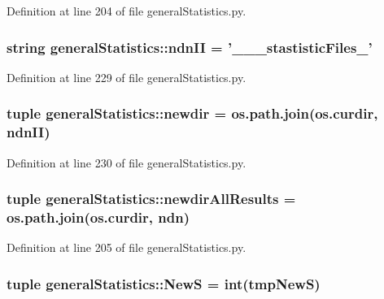 \-Definition at line 204 of file general\-Statistics.\-py.

\hypertarget{namespacegeneral_statistics_a7ccf9a2d306ba41029a6c988dea19484}{
\subsubsection[{ndn\-I\-I}]{\setlength{\rightskip}{0pt plus 5cm}string {\bf general\-Statistics\-::ndn\-I\-I} = '\-\_\-\-\_\-\_\-stastistic\-Files\-\_\-'}}\label{namespacegeneral_statistics_a7ccf9a2d306ba41029a6c988dea19484}


\-Definition at line 229 of file general\-Statistics.\-py.

\hypertarget{namespacegeneral_statistics_a862af869b2c09a9bcb32f2c159d387e8}{
\subsubsection[{newdir}]{\setlength{\rightskip}{0pt plus 5cm}tuple {\bf general\-Statistics\-::newdir} = os.\-path.\-join(os.\-curdir, {\bf ndn\-I\-I})}}\label{namespacegeneral_statistics_a862af869b2c09a9bcb32f2c159d387e8}


\-Definition at line 230 of file general\-Statistics.\-py.

\hypertarget{namespacegeneral_statistics_a467e98804f050cc4600b0705a664fea1}{
\subsubsection[{newdir\-All\-Results}]{\setlength{\rightskip}{0pt plus 5cm}tuple {\bf general\-Statistics\-::newdir\-All\-Results} = os.\-path.\-join(os.\-curdir, {\bf ndn})}}\label{namespacegeneral_statistics_a467e98804f050cc4600b0705a664fea1}


\-Definition at line 205 of file general\-Statistics.\-py.

\hypertarget{namespacegeneral_statistics_a0418b52e2bcb77390b50c70b94197f48}{
\subsubsection[{\-New\-S}]{\setlength{\rightskip}{0pt plus 5cm}tuple {\bf general\-Statistics\-::\-New\-S} = int(tmp\-New\-S)}}\label{namespacegeneral_statistics_a0418b52e2bcb77390b50c70b94197f48}


